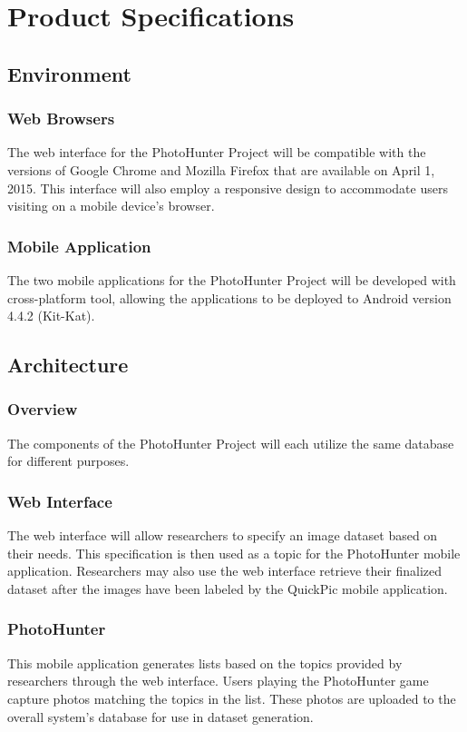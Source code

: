 \documentclass{article}
\begin{document}
\section{Product Specifications}

\subsection{Environment}

\subsubsection{Web Browsers}
The web interface for the PhotoHunter Project will be compatible with the
versions of Google Chrome and Mozilla Firefox that are available on April 1,
2015. This interface will also employ a responsive design to accommodate users
visiting on a mobile device's browser.

\subsubsection{Mobile Application}
The two mobile applications for the PhotoHunter Project will be developed with
cross-platform tool, allowing the applications to be deployed to Android
version 4.4.2 (Kit-Kat).

\subsection{Architecture}

\subsubsection{Overview}
The components of the PhotoHunter Project will each utilize the same database
for different purposes.

\subsubsection{Web Interface}
The web interface will allow researchers to specify an image dataset based on
their needs. This specification is then used as a topic for the PhotoHunter
mobile application. Researchers may also use the web interface retrieve their
finalized dataset after the images have been labeled by the QuickPic mobile
application.

\subsubsection{PhotoHunter}
This mobile application generates lists based on the topics provided by
researchers through the web interface. Users playing the PhotoHunter game
capture photos matching the topics in the list. These photos are uploaded to
the overall system's database for use in dataset generation.
\end{document}
